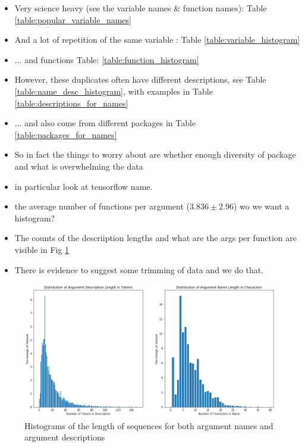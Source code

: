 \begin{itemize}
    \item Very science heavy (see the variable names \& function names): Table \ref{table:popular_variable_names}
    \item And a lot of repetition of the same variable : Table \ref{table:variable_histogram}
    \item ... and functions Table: \ref{table:function_histogram}
    \item However, these duplicates often have different descriptions, see Table \ref{table:name_desc_histogram}, with examples in Table \ref{table:descriptions_for_names}
    \item ... and also come from different packages in Table \ref{table:packages_for_names}
    \item So in fact the things to worry about are whether enough diversity of package and what is overwhelming the data
    \item in particular look at tensorflow name. 
    \item the average number of functions per argument ($3.836 \pm 2.96$) wo we want a histogram?
    \item The counts of the descriiption lengths and what are the args per function are visible in Fig \ref{fig:seq_length} 
    \item There is evidence to suggest some trimming of data and we do that.

\end{itemize}


\begin{figure}
    \begin{center}
    \includegraphics[scale=.5]{SEC4_SequenceLength.png}    
    \end{center}  
        \caption{Histograms of the length of sequences for both argument names and argument descriptions}
    \label{fig:seq_length}
 
\end{figure}

